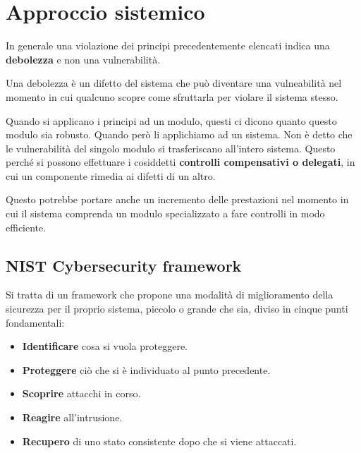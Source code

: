 \section{Approccio sistemico}
In generale una violazione dei principi precedentemente elencati indica una \textbf{debolezza} e non una
vulnerabilità.

Una debolezza è un difetto del sistema che può diventare una vulneabilità nel momento in cui qualcuno scopre come
sfruttarla per violare il sistema stesso.

Quando si applicano i principi ad un modulo, questi ci dicono quanto questo modulo sia robusto. Quando però li
applichiamo ad un sistema. Non è detto che le vulnerabilità del singolo modulo si trasferiscano all'intero sistema.
Questo perché si possono effettuare i cosiddetti \textbf{controlli compensativi o delegati}, in cui un componente
rimedia ai difetti di un altro.

Questo potrebbe portare anche un incremento delle prestazioni nel momento in cui il sistema comprenda un modulo
specializzato a fare controlli in modo efficiente.

\subsection{NIST Cybersecurity framework}
Si tratta di un framework che propone una modalità di miglioramento della sicurezza per il proprio sistema, piccolo o
grande che sia, diviso in cinque punti fondamentali:
\begin{itemize}
	\item \textbf{Identificare} cosa si vuola proteggere.
	\item \textbf{Proteggere} ciò che si è individuato al punto precedente.
	\item \textbf{Scoprire} attacchi in corso.
	\item \textbf{Reagire} all'intrusione.
	\item \textbf{Recupero} di uno stato consistente dopo che si viene attaccati.
\end{itemize}
